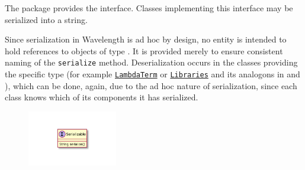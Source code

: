 The \texttt{} package provides the \texttt{}
interface. Classes implementing this interface may be serialized into a string.

Since serialization in Wavelength is ad hoc by design, no entity is intended to hold
references to objects of type \texttt{}. It is provided merely to
ensure consistent naming of the \texttt{serialize} method. Deserialization occurs
in the classes providing the specific type (for example \texttt{\hyperref[type:edu.kit.wavelength.client.model.term.LambdaTerm]{LambdaTerm}}
or \texttt{\hyperref[type:edu.kit.wavelength.client.model.library.Libraries]{Libraries}} and its analogons in \texttt{}
and \texttt{}), which can be done, again, due to the ad hoc nature
of serialization, since each class knows which of its components it has serialized.

\begin{figure}[H]
	\centering
	\includegraphics[width=0.35\textwidth]{packageDiagrams/serializationPackage}
\end{figure}

